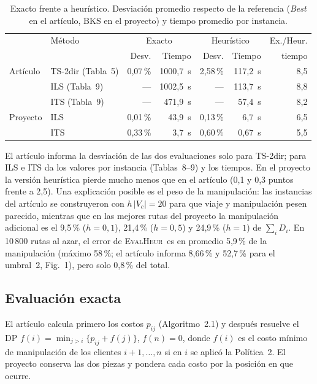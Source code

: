 \documentclass{article}
\newcommand{\EvalH}{\mbox{\textsc{EvalHeur}}}
\begin{document}
\begin{table}[H]\centering\small
\caption{Exacto frente a heurístico. Desviación promedio respecto de la referencia (\emph{Best} en el artículo, BKS en el proyecto) y tiempo promedio por instancia.}\label{tab:exhe}
\renewcommand{\arraystretch}{1.25}
\begin{tabular}{l l r r r r r}
\toprule
\rowcolor{papel} & Método & \multicolumn{2}{c}{Exacto} & \multicolumn{2}{c}{Heurístico} & Ex./Heur. \\
\rowcolor{papel} & & Desv. & Tiempo & Desv. & Tiempo & tiempo \\
\midrule
Artículo & TS-2dir (Tabla~5) & 0,07\,\% & 1000,7~s & 2,58\,\% & 117,2~s & 8,5 \\
         & ILS (Tabla~9)     & --- & 1002,5~s & --- & 113,7~s & 8,8 \\
         & ITS (Tabla~9)     & --- & 471,9~s & --- & 57,4~s & 8,2 \\
\midrule
Proyecto & ILS & 0,01\,\% & 43,9~s & 0,13\,\% & 6,7~s & 6,5 \\
         & ITS & 0,33\,\% & 3,7~s & 0,60\,\% & 0,67~s & 5,5 \\
\bottomrule
\end{tabular}
\end{table}

\noindent El artículo informa la desviación de las dos evaluaciones solo para TS-2dir; para ILS e ITS da los valores por instancia (Tablas~8--9) y los tiempos. En el proyecto la versión heurística pierde mucho menos que en el artículo (0,1 y 0,3 puntos frente a 2,5). Una explicación posible es el peso de la manipulación: las instancias del artículo se construyeron con $h\,|V_c| = 20$ para que viaje y manipulación pesen parecido, mientras que en las mejores rutas del proyecto la manipulación adicional es el 9,5\,\% ($h = 0{,}1$), 21,4\,\% ($h = 0{,}5$) y 24,9\,\% ($h = 1$) de $\sum_i D_i$. En 10\,800 rutas al azar, el error de \EvalH\ es en promedio 5,9\,\% de la manipulación (máximo 58\,\%; el artículo informa 8,66\,\% y 52,7\,\% para el umbral~2, Fig.~1), pero solo 0,8\,\% del total.

\subsection{Evaluación exacta}

El artículo calcula primero los costos $p_{ij}$ (Algoritmo~2.1) y después resuelve el DP $f(i) = \min_{j > i}\{p_{ij} + f(j)\}$, $f(n) = 0$, donde $f(i)$ es el costo mínimo de manipulación de los clientes $i+1,\dots,n$ si en $i$ se aplicó la Política~2. El proyecto conserva las dos piezas y pondera cada costo por la posición en que ocurre.
\end{document}
